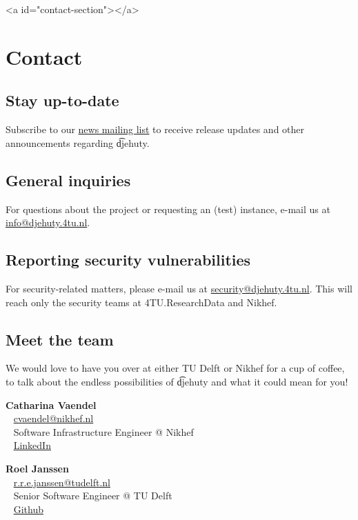\ifdefined\HCode
\begin{html}
<a id="contact-section"></a>
\end{html}
\fi
\chapter*{Contact}

\section*{Stay up-to-date}

  Subscribe to our \href{https://djehuty.4tu.nl/postorius/lists/news.djehuty.4tu.nl/}%
  {news mailing list} to receive release updates and other
  announcements regarding \t{djehuty}.

\section*{General inquiries}

  For questions about the project or requesting an (test) instance,
  e-mail us at \href{mailto:info@djehuty.4tu.nl}{info@djehuty.4tu.nl}.

\section*{Reporting security vulnerabilities}

  For security-related matters, please e-mail us at
  \href{mailto:security@djehuty.4tu.nl}{security@djehuty.4tu.nl}. This
  will reach only the security teams at 4TU.ResearchData and Nikhef.

\section*{Meet the team}

We would love to have you over at either TU Delft or Nikhef for a cup
of coffee, to talk about the endless possibilities of \t{djehuty} and
what it could mean for you!

\textbf{Catharina Vaendel}\\~
\href{mailto:cvaendel@nikhef.nl}{cvaendel@nikhef.nl}\\~
Software Infrastructure Engineer @ Nikhef\\~
\href{https://www.linkedin.com/in/catharinavaendel}{LinkedIn}

\textbf{Roel Janssen}\\~
\href{mailto:r.r.e.janssen@tudelft.nl}{r.r.e.janssen@tudelft.nl}\\~
Senior Software Engineer @ TU Delft\\~
\href{https://github.com/roelj}{Github}
